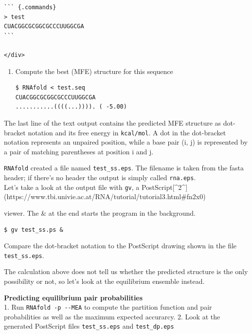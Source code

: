 \documentclass[]{article}
\providecommand{\tightlist}{%
  \setlength{\itemsep}{0pt}\setlength{\parskip}{0pt}}
\begin{document}
\begin{verbatim}
``` {.commands}
> test
CUACGGCGCGGCGCCCUUGGCGA
```

</div>
\end{verbatim}

\begin{enumerate}
\def\labelenumi{\arabic{enumi}.}
\setcounter{enumi}{1}
\tightlist
\item
  Compute the best (MFE) structure for this sequence

\begin{verbatim}
$ RNAfold < test.seq
CUACGGCGCGGCGCCCUUGGCGA
...........((((...)))). ( -5.00)
\end{verbatim}
\end{enumerate}

The last line of the text output contains the predicted MFE structure as
dot-bracket notation and its free energy in \texttt{kcal/mol}. A dot in
the dot-bracket notation represents an unpaired position, while a base
pair (i, j) is represented by a pair of matching parentheses at position
i and j.

\texttt{RNAfold} created a file named \texttt{test\_ss.eps}. The filename
is taken from the fasta header; if there's no header the output is
simply called \texttt{rna.eps}.\\
Let's take a look at the output file with \texttt{gv}, a
PostScript{{[}\^{}2\^{}{]}(https://www.tbi.univie.ac.at/RNA/tutorial/tutorial3.html\#fn2x0)}
viewer. The \& at the end starts the program in the background.

\begin{verbatim}
$ gv test_ss.ps &
\end{verbatim}

Compare the dot-bracket notation to the PostScript drawing shown in the
file \texttt{test\_ss.eps}.

The calculation above does not tell us whether the predicted structure
is the only possibility or not, so let's look at the equilibrium
ensemble instead.

\textbf{Predicting equilibrium pair probabilities}\\
1. Run \texttt{RNAfold\ -p\ -\/-MEA} to compute the partition function
and pair probabilities as well as the maximum expected accurarcy. 2.
Look at the generated PostScript files \texttt{test\_ss.eps} and
\texttt{test\_dp.eps}
\end{document}
